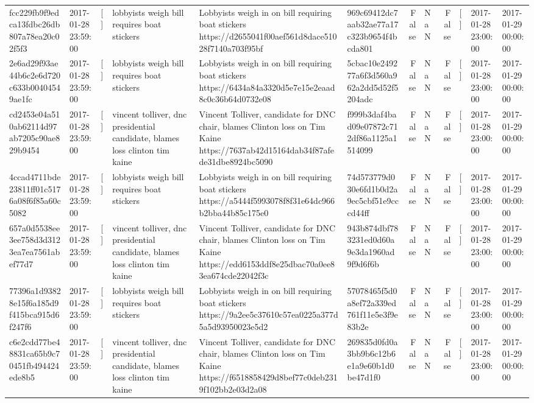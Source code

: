 \begin{tabular}{llllllrlrlll}
fcc229fb9f9edca13fdbc26db807a78ea20c02f5f3 & 2017-01-28 23:59:00 & [] & lobbyists weigh bill requires boat stickers & Lobbyists weigh in on bill requiring boat stickers https://d2655041f00aef561d8dace51028f7140a703f95bf & 969c69412dc7aab32ae77a17c323b9654f4bcda801 & False & NaN & False & [] & 2017-01-28 23:00:00 & 2017-01-29 00:00:00 \\
2e6ad29f93ae44b6c2e6d720c633b00404549ae1fc & 2017-01-28 23:59:00 & [] & lobbyists weigh bill requires boat stickers & Lobbyists weigh in on bill requiring boat stickers https://6434a84a3320d5e7e15e2eaad8c0c36b64d0732e08 & 5cbac10e249277a6f3d560a962a2dd5d52f5204adc & False & NaN & False & [] & 2017-01-28 23:00:00 & 2017-01-29 00:00:00 \\
cd2453e04a510ab62114d97ab7205c90ae829b9454 & 2017-01-28 23:59:00 & [] & vincent tolliver, dnc presidential candidate, blames loss clinton tim kaine & Vincent Tolliver, candidate for DNC chair, blames Clinton loss on Tim Kaine https://7637ab42d15164dab34f87afede31dbe8924bc5090 & f999b3daf4bad09e07872c712df86a1125a1514099 & False & NaN & False & [] & 2017-01-28 23:00:00 & 2017-01-29 00:00:00 \\
4ccad4711bde23811ff01c5176a08f6f85a60c5082 & 2017-01-28 23:59:00 & [] & lobbyists weigh bill requires boat stickers & Lobbyists weigh in on bill requiring boat stickers https://a5444f5993078f8f31e64dc966b2bba44b85c175e0 & 74d573779d030e6fd1b0d2a9ec5cbf51e9cccd44ff & False & NaN & False & [] & 2017-01-28 23:00:00 & 2017-01-29 00:00:00 \\
657a0d5538ee3ee758d3d3123ea7ea7561abef77d7 & 2017-01-28 23:59:00 & [] & vincent tolliver, dnc presidential candidate, blames loss clinton tim kaine & Vincent Tolliver, candidate for DNC chair, blames Clinton loss on Tim Kaine https://edd6153ddf8e25dbac70a0ee83ea674cde22042f3c & 943b874dbf783231ed0d60a9e3da1960ad9f9d6f6b & False & NaN & False & [] & 2017-01-28 23:00:00 & 2017-01-29 00:00:00 \\
77396a1d93828e15f6a185d9f415bca915d6f247f6 & 2017-01-28 23:59:00 & [] & lobbyists weigh bill requires boat stickers & Lobbyists weigh in on bill requiring boat stickers https://9a2ee5c37610c57ea0225a377d5a5d93950023e5d2 & 57078465f5d0a8ef72a339ed761f11e5e3f9e83b2e & False & NaN & False & [] & 2017-01-28 23:00:00 & 2017-01-29 00:00:00 \\
c6e2cdd77be48831ca65b9c70451fb494424ede8b5 & 2017-01-28 23:59:00 & [] & vincent tolliver, dnc presidential candidate, blames loss clinton tim kaine & Vincent Tolliver, candidate for DNC chair, blames Clinton loss on Tim Kaine https://f6518858429d8bef77c0deb2319f102bb2e03d2a08 & 269835d0fd0a3bb9b6c12b6e1a9e60b1d0be47d1f0 & False & NaN & False & [] & 2017-01-28 23:00:00 & 2017-01-29 00:00:00 \\

\end{tabular}
